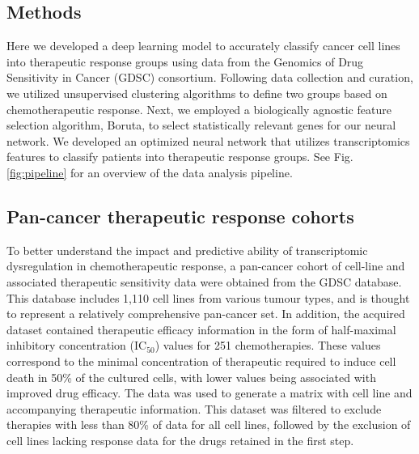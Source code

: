 \documentclass[10pt, letterpaper]{article}
\begin{document}
\begin{multicols*}{2}
\section{Methods}

Here we developed a deep learning model to accurately classify cancer cell lines into therapeutic response groups using data from the Genomics of Drug Sensitivity in Cancer (GDSC) consortium. Following data collection and curation, we utilized unsupervised clustering algorithms to define two groups based on chemotherapeutic response. Next, we employed a biologically agnostic feature selection algorithm, Boruta, to select statistically relevant genes for our neural network. We developed an optimized neural network that utilizes transcriptomics features to classify patients into therapeutic response groups. See Fig. \ref{fig:pipeline} for an overview of the data analysis pipeline.


\subsection*{Pan-cancer therapeutic response cohorts}
To better understand the impact and predictive ability of transcriptomic dysregulation in chemotherapeutic response, a pan-cancer cohort of cell-line and associated therapeutic sensitivity data were obtained from the GDSC database. This database includes 1,110 cell lines from various tumour types, and is thought to represent a relatively comprehensive pan-cancer set. In addition, the acquired dataset contained therapeutic efficacy information in the form of half-maximal inhibitory concentration (IC$_{50}$) values for 251 chemotherapies. These values correspond to the minimal concentration of therapeutic required to induce cell death in 50\% of the cultured cells, with lower values being associated with improved drug efficacy. The data was used to generate a matrix with cell line and accompanying therapeutic information. This dataset was filtered to exclude therapies with less than 80\% of data for all cell lines, followed by the exclusion of cell lines lacking response data for the drugs retained in the first step.



\end{multicols*}
\end{document}
